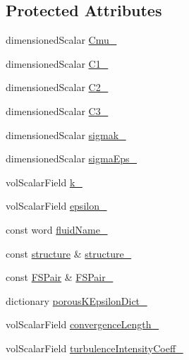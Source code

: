 \subsection*{Protected Attributes}
\begin{DoxyCompactItemize}
\item 
dimensioned\+Scalar \hyperlink{classFoam_1_1RASModels_1_1porousKEpsilon_aca8750ac64529f08a5e0ddbd69d538db}{Cmu\+\_\+}
\item 
dimensioned\+Scalar \hyperlink{classFoam_1_1RASModels_1_1porousKEpsilon_a25ef984db7a92f8f2421ed817e616206}{C1\+\_\+}
\item 
dimensioned\+Scalar \hyperlink{classFoam_1_1RASModels_1_1porousKEpsilon_a6ecae7b56fdac924dca1bf174f157f69}{C2\+\_\+}
\item 
dimensioned\+Scalar \hyperlink{classFoam_1_1RASModels_1_1porousKEpsilon_aed8039605824e63ab9ac285e15c70bb7}{C3\+\_\+}
\item 
dimensioned\+Scalar \hyperlink{classFoam_1_1RASModels_1_1porousKEpsilon_a1c4d80e34d39e7ffccd625df6016b6f7}{sigmak\+\_\+}
\item 
dimensioned\+Scalar \hyperlink{classFoam_1_1RASModels_1_1porousKEpsilon_a2f26c65464368e5619b31aa5d5392a19}{sigma\+Eps\+\_\+}
\item 
vol\+Scalar\+Field \hyperlink{classFoam_1_1RASModels_1_1porousKEpsilon_a2166e9ffd139700fb0f21c44414e3545}{k\+\_\+}
\item 
vol\+Scalar\+Field \hyperlink{classFoam_1_1RASModels_1_1porousKEpsilon_a027dddd791551bd248d0fcacb013dd68}{epsilon\+\_\+}
\item 
const word \hyperlink{classFoam_1_1RASModels_1_1porousKEpsilon_a833e83efda396d14fa3d66c52df80ee4}{fluid\+Name\+\_\+}
\item 
const \hyperlink{classFoam_1_1structure}{structure} \& \hyperlink{classFoam_1_1RASModels_1_1porousKEpsilon_a036e5523c5ec733c6115d5f2b7446583}{structure\+\_\+}
\item 
const \hyperlink{classFoam_1_1FSPair}{F\+S\+Pair} \& \hyperlink{classFoam_1_1RASModels_1_1porousKEpsilon_a9b97bb673e337335c3a0b01549b3667f}{F\+S\+Pair\+\_\+}
\item 
dictionary \hyperlink{classFoam_1_1RASModels_1_1porousKEpsilon_a916a9ea5c0f43703f3d49c7e8113be8f}{porous\+K\+Epsilon\+Dict\+\_\+}
\item 
vol\+Scalar\+Field \hyperlink{classFoam_1_1RASModels_1_1porousKEpsilon_abab8e904bd578faa6c7100b6c2e55b1a}{convergence\+Length\+\_\+}
\item 
vol\+Scalar\+Field \hyperlink{classFoam_1_1RASModels_1_1porousKEpsilon_a9909ff13f66ffb4fc152e52f6568d41f}{turbulence\+Intensity\+Coeff\+\_\+}

\end{DoxyCompactItemize}
